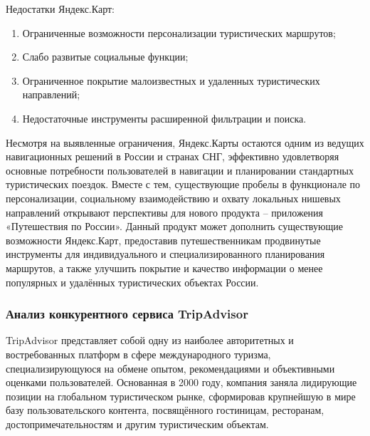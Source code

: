 \noindent Недостатки Яндекс.Карт:
\begin{enumerate}
    \item Ограниченные возможности персонализации туристических маршрутов;
    \item Слабо развитые социальные функции;
    \item Ограниченное покрытие малоизвестных и удаленных туристических направлений;
    \item Недостаточные инструменты расширенной фильтрации и поиска.
\end{enumerate}

\noindent Несмотря на выявленные ограничения, Яндекс.Карты остаются одним из ведущих навигационных решений в России и странах СНГ, эффективно удовлетворяя основные потребности пользователей в навигации и планировании стандартных туристических поездок. Вместе с тем, существующие пробелы в функционале по персонализации, социальному взаимодействию и охвату локальных нишевых направлений открывают перспективы для нового продукта – приложения «Путешествия по России». Данный продукт может дополнить существующие возможности Яндекс.Карт, предоставив путешественникам продвинутые инструменты для индивидуального и специализированного планирования маршрутов, а также улучшить покрытие и качество информации о менее популярных и удалённых туристических объектах России.

\subsubsection*{Анализ конкурентного сервиса TripAdvisor}
TripAdvisor представляет собой одну из наиболее авторитетных и востребованных платформ в сфере международного туризма, специализирующуюся на обмене опытом, рекомендациями и объективными оценками пользователей. Основанная в 2000 году, компания заняла лидирующие позиции на глобальном туристическом рынке, сформировав крупнейшую в мире базу пользовательского контента, посвящённого гостиницам, ресторанам, достопримечательностям и другим туристическим объектам.

